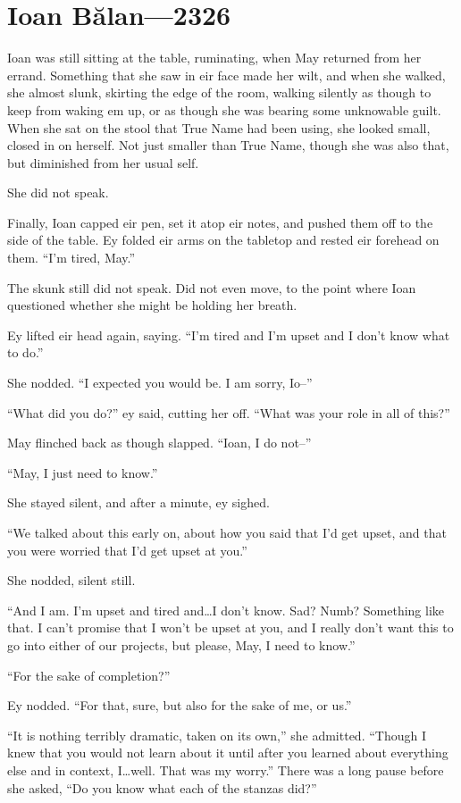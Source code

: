 \hypertarget{ioan-bux103lan-2326}{%
\chapter{Ioan Bălan—2326}\label{ioan-bux103lan-2326}}

Ioan was still sitting at the table, ruminating, when May returned from her errand. Something that she saw in eir face made her wilt, and when she walked, she almost slunk, skirting the edge of the room, walking silently as though to keep from waking em up, or as though she was bearing some unknowable guilt. When she sat on the stool that True Name had been using, she looked small, closed in on herself. Not just smaller than True Name, though she was also that, but diminished from her usual self.

She did not speak.

Finally, Ioan capped eir pen, set it atop eir notes, and pushed them off to the side of the table. Ey folded eir arms on the tabletop and rested eir forehead on them. ``I'm tired, May.''

The skunk still did not speak. Did not even move, to the point where Ioan questioned whether she might be holding her breath.

Ey lifted eir head again, saying. ``I'm tired and I'm upset and I don't know what to do.''

She nodded. ``I expected you would be. I am sorry, Io--''

``What did you do?'' ey said, cutting her off. ``What was your role in all of this?''

May flinched back as though slapped. ``Ioan, I do not--''

``May, I just need to know.''

She stayed silent, and after a minute, ey sighed.

``We talked about this early on, about how you said that I'd get upset, and that you were worried that I'd get upset at you.''

She nodded, silent still.

``And I am. I'm upset and tired and\ldots I don't know. Sad? Numb? Something like that. I can't promise that I won't be upset at you, and I really don't want this to go into either of our projects, but please, May, I need to know.''

``For the sake of completion?''

Ey nodded. ``For that, sure, but also for the sake of me, or us.''

``It is nothing terribly dramatic, taken on its own,'' she admitted. ``Though I knew that you would not learn about it until after you learned about everything else and in context, I\ldots well. That was my worry.'' There was a long pause before she asked, ``Do you know what each of the stanzas did?''

